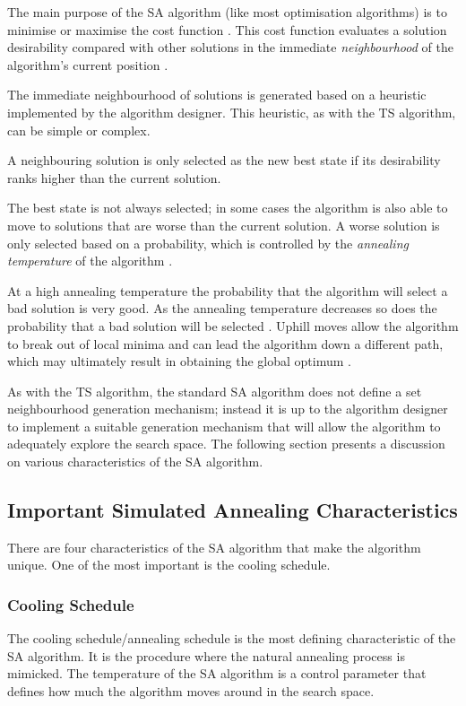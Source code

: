 The main purpose of the \gls{SA} algorithm (like most optimisation algorithms) is to minimise or maximise the cost function \cite{SASingleMultiObj}. This cost function evaluates a solution desirability compared with other solutions in the immediate \emph{neighbourhood} of the algorithm's current position \cite{TheoPraticalSA}. 

The immediate neighbourhood of solutions is generated based on a heuristic implemented by the algorithm designer\cite{AIModernApproach}. This heuristic, as with the \gls{TS} algorithm, can be simple or complex.

A neighbouring solution is only selected as the new best state if its desirability ranks higher than the current solution.

The best state is not always selected; in some cases the algorithm is also able to move to solutions that are worse than the current solution. A worse solution is only selected based on a probability, which is controlled by the \emph{annealing temperature} of the algorithm \cite{TheoPraticalSA}. 

At a high annealing temperature the probability that the algorithm will select a bad solution is very good. As the annealing temperature decreases so does the probability that a bad solution will be selected \cite{CurveFittingSA}.  Uphill moves allow the algorithm to break out of local minima and can lead the algorithm down a different path, which may ultimately result in obtaining the global optimum \cite{SASingleMultiObj}. 

As with the \gls{TS} algorithm, the standard \gls{SA} algorithm does not define a set neighbourhood generation mechanism; instead it is up to the algorithm designer to implement a suitable generation mechanism that will allow the algorithm to adequately explore the search space\cite{VariousCoolingSA}. 
The following section presents a discussion on various characteristics of the \gls{SA} algorithm.
\subsection{Important Simulated Annealing Characteristics}
There are four characteristics of the \gls{SA} algorithm that make the algorithm unique. One of the most important is the cooling schedule. 

\subsubsection{Cooling Schedule}
The cooling schedule/annealing schedule is the most defining characteristic of the \gls{SA} algorithm. It is the procedure where the natural annealing process is mimicked. The temperature of the \gls{SA} algorithm is a control parameter that defines how much the algorithm moves around in the search space.

